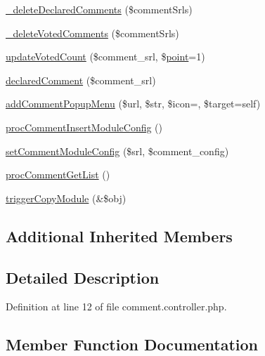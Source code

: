 \begin{DoxyCompactItemize}
\item 
\hyperlink{classcommentController_a06a2f96cd357550dd0cd834d7e61f4bf}{\+\_\+delete\+Declared\+Comments} (\$comment\+Srls)
\item 
\hyperlink{classcommentController_a0e4216451f3bb1c02aeec98bb4f54ddc}{\+\_\+delete\+Voted\+Comments} (\$comment\+Srls)
\item 
\hyperlink{classcommentController_abe720cae94b04ba356b00f80f6880e91}{update\+Voted\+Count} (\$comment\+\_\+srl, \$\hyperlink{classpoint}{point}=1)
\item 
\hyperlink{classcommentController_aaae1e5860a1e170a8fc3142f80bbcde6}{declared\+Comment} (\$comment\+\_\+srl)
\item 
\hyperlink{classcommentController_aa3ab9560f24f8343f241444a5432f857}{add\+Comment\+Popup\+Menu} (\$url, \$str, \$icon=\textquotesingle{}\textquotesingle{}, \$target=\textquotesingle{}self\textquotesingle{})
\item 
\hyperlink{classcommentController_ab4a71283244210be754cceb8511e8789}{proc\+Comment\+Insert\+Module\+Config} ()
\item 
\hyperlink{classcommentController_a3e4d45ad61f74541e1182c29924b625d}{set\+Comment\+Module\+Config} (\$srl, \$comment\+\_\+config)
\item 
\hyperlink{classcommentController_ac9edb9826c8b07ceb1a4db29c5db514a}{proc\+Comment\+Get\+List} ()
\item 
\hyperlink{classcommentController_a5cf1c177c5cbdd0556363a0204d92f5f}{trigger\+Copy\+Module} (\&\$obj)
\end{DoxyCompactItemize}
\subsection*{Additional Inherited Members}


\subsection{Detailed Description}


Definition at line 12 of file comment.\+controller.\+php.



\subsection{Member Function Documentation}
\mbox{\label{classcommentController_a06a2f96cd357550dd0cd834d7e61f4bf}} 
